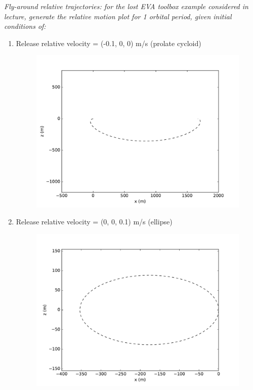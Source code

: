\documentclass[onecolumn,10pt]{jhwhw}
\begin{document}
\problem{}
\textit{Fly-around relative trajectories: for the lost EVA toolbox example considered in lecture, generate the relative motion plot for 1 orbital period, given initial conditions of:}
\begin{enumerate}
\itemsep0em
\item Release relative velocity = (-0.1, 0, 0) m/s (prolate cycloid)
\begin{figure}[h!]
\begin{center}
\includegraphics[height=0.37\textheight]{6a.pdf}
\end{center}
\end{figure}
\item Release relative velocity = (0, 0, 0.1) m/s (ellipse)
\begin{figure}[h!]
\begin{center}
\includegraphics[height=0.37\textheight]{6b.pdf}

\end{center}
\end{figure}
\end{enumerate}
\end{document}
